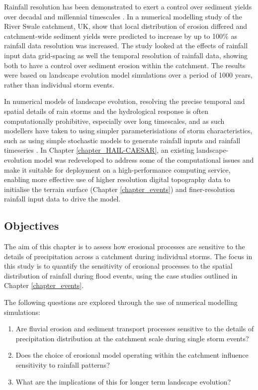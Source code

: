 Rainfall resolution has been demonstrated to exert a control over sediment yields over decadal and millennial timescales \citep{coulthard2016sensitivity}. In a numerical modelling study of the River Swale catchment, UK, \citet{coulthard2016sensitivity} show that local distribution of erosion differed and catchment-wide sediment yields were predicted to increase by up to 100\% as rainfall data resolution was increased. The study looked at the effects of rainfall input data grid-spacing as well the temporal resolution of rainfall data, showing both to have a control over sediment erosion within the catchment. The results were based on landscape evolution model simulations over a period of 1000 years, rather than individual storm events.

In numerical models of landscape evolution, resolving the precise temporal and spatial details of rain storms and the hydrological response is often computationally prohibitive, especially over long timescales, and as such modellers have taken to using simpler parameterisiations of storm characteristics, such as using simple stochastic models to generate rainfall inputs and rainfall timeseries \citep{Eagleson1978,Tucker2001}. In Chapter \ref{chapter_HAIL-CAESAR}, an existing landscape-evolution model was redeveloped to address some of the computational issues and make it suitable for deployment on a high-performance computing service, enabling more effective use of higher resolution digital topography data to initialise the terrain surface (Chapter \ref{chapter_events}) and finer-resolution rainfall input data to drive the model.

\subsection{Objectives}
The aim of this chapter is to assess how erosional processes are sensitive to the details of precipitation across a catchment during individual storms. The focus in this study is to quantify the sensitivity of erosional processes to the spatial distribution of rainfall during flood events, using the case studies outlined in Chapter \ref{chapter_events}.

The following questions are explored through the use of numerical modelling simulations:

\begin{enumerate}
\item Are fluvial erosion and sediment transport processes sensitive to the details of precipitation distribution at the catchment scale during single storm events?
\item Does the choice of erosional model operating within the catchment influence sensitivity to rainfall patterns? 
\item What are the implications of this for longer term landscape evolution? 
\end{enumerate}

